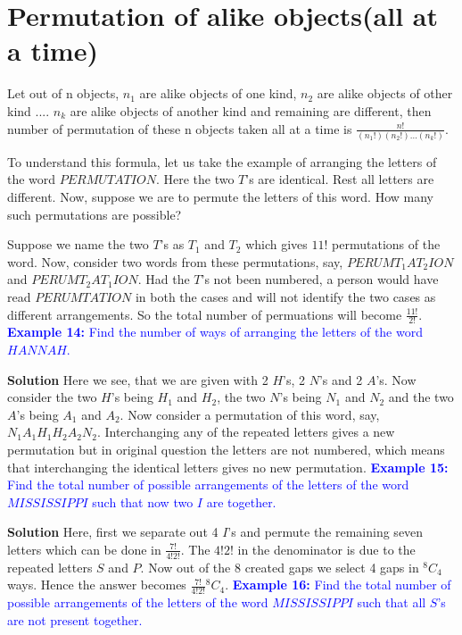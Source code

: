 \documentclass[12pt, a4paper]{article}
\begin{document}
\section{Permutation of alike objects(all at a time)}
\begin{tcolorbox}[colback=ProcessBlue!10!White,colframe=Blue!60!White]
Let out of n objects, $n_1$ are alike objects of one kind, $n_2$ are alike objects of other kind .... $n_k$ are alike objects of another kind and remaining are different, then number of permutation of these n objects taken all at a time is $\frac{n!}{(n_{1}!)(n_{2}!)...(n_{k}!)}$.
\end{tcolorbox}
To understand this formula, let us take the example of arranging the letters of the word $PERMUTATION$. Here the two $T$'s are identical. Rest all letters are different. Now, suppose we are to permute the letters of this word. How many such permutations are possible?

Suppose we name the two $T$'s as $T_1$ and $T_2$ which gives $11!$ permutations of the word. Now, consider two words from these permutations, say, $PERUMT_{1}AT_{2}ION$ and $PERUMT_{2}AT_{1}ION$. Had the $T$'s not been numbered, a person would have read $PERUMTATION$ in both the cases and will not identify the two cases as different arrangements. So the total number of permuations will become $\frac{11!}{2!}$.\newline
\textcolor{blue}{\textbf{Example 14:} Find the number of ways of arranging the letters of the word $HANNAH$.}

\textbf{Solution} Here we see, that we are given with 2 $H$'s, 2 $N$'s and 2 $A$'s. Now consider the two $H$'s being $H_1$ and $H_2$, the two $N$'s being $N_1$ and $N_2$ and the two $A$'s being $A_1$ and $A_2$. Now consider a permutation of this word, say, $N_{1}A_{1}H_{1}H_{2}A_{2}N_{2}$. Interchanging any of the repeated letters gives a new permutation but in original question the letters are not numbered, which means that interchanging the identical letters gives no new permutation.\newline
\textcolor{blue}{\textbf{Example 15:} Find the total number of possible arrangements of the letters of the word $MISSISSIPPI$ such that now two $I$ are together.}

\textbf{Solution} Here, first we separate out 4 $I$'s and permute the remaining seven letters which can be done in $\frac{7!}{4!2!}$. The $4!2!$ in the denominator is due to the repeated letters $S$ and $P$. Now out of the 8 created gaps we select 4 gaps in $^8C_4$ ways. Hence the answer becomes $\frac{7!}{4!2!}{^8C_4}$. \newline
\textcolor{blue}{\textbf{Example 16:} Find the total number of possible arrangements of the letters of the word $MISSISSIPPI$ such that all $S$'s are not present together.}
\end{document}
